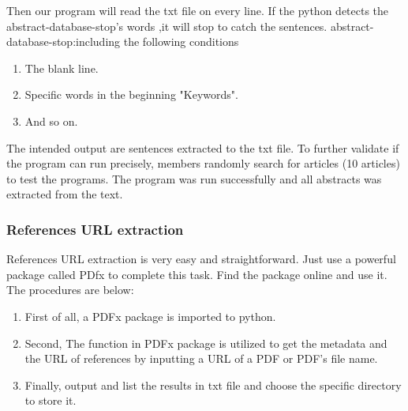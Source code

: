 
Then our program will read the txt file on every line.
If the python detects the abstract-database-stop's words ,it will stop to catch the sentences.
abstract-database-stop:including the following conditions

\begin{enumerate}
	
	\item The blank line.
	\item Specific words in the beginning "Keywords".
	\item And so on.
	
\end{enumerate}

The intended output are sentences extracted to the txt file.
To further validate if the program can run precisely, members randomly search for articles (10 articles) to test the programs.
The program was run successfully and all abstracts was extracted from the text.

\subsubsection{References URL extraction}

References URL extraction is very easy and straightforward.
Just use a powerful package called PDfx to complete this task.
Find the package online and use it.
The procedures are below:

\begin{enumerate}
	
	\item First of all, a PDFx package is imported to python.
	\item Second, The function in PDFx package is utilized to get the metadata and the URL of references by inputting a URL of a PDF or PDF's file name.
	\item Finally, output and list the results in txt file and choose the specific directory to store it.
	
\end{enumerate}

